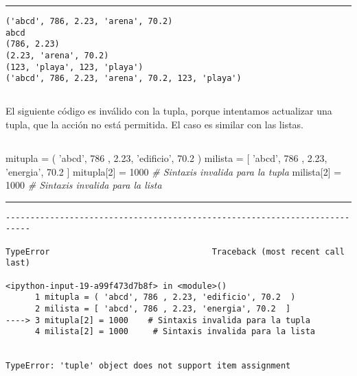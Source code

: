 \documentclass[]{article}
\newenvironment{Shaded}{}{}
\newcommand{\DecValTok}[1]{\textcolor[rgb]{0.25,0.63,0.44}{#1}}
\newcommand{\FloatTok}[1]{\textcolor[rgb]{0.25,0.63,0.44}{#1}}
\newcommand{\StringTok}[1]{\textcolor[rgb]{0.25,0.44,0.63}{#1}}
\newcommand{\CommentTok}[1]{\textcolor[rgb]{0.38,0.63,0.69}{\textit{#1}}}
\newcommand{\OperatorTok}[1]{\textcolor[rgb]{0.40,0.40,0.40}{#1}}
\newcommand{\NormalTok}[1]{#1}
\begin{document}
\begin{center}\rule{0.5\linewidth}{\linethickness}\end{center}

\begin{verbatim}
('abcd', 786, 2.23, 'arena', 70.2)
abcd
(786, 2.23)
(2.23, 'arena', 70.2)
(123, 'playa', 123, 'playa')
('abcd', 786, 2.23, 'arena', 70.2, 123, 'playa')
\end{verbatim}

\subsection{}\label{section-34}

El siguiente código es inválido con la tupla, porque intentamos
actualizar una tupla, que la acción no está permitida. El caso es
similar con las listas.

\subsection{}\label{section-35}

\begin{Shaded}
\begin{Highlighting}[]
\NormalTok{mitupla }\OperatorTok{=}\NormalTok{ ( }\StringTok{'abcd'}\NormalTok{, }\DecValTok{786}\NormalTok{ , }\FloatTok{2.23}\NormalTok{, }\StringTok{'edificio'}\NormalTok{, }\FloatTok{70.2}\NormalTok{  )}
\NormalTok{milista }\OperatorTok{=}\NormalTok{ [ }\StringTok{'abcd'}\NormalTok{, }\DecValTok{786}\NormalTok{ , }\FloatTok{2.23}\NormalTok{, }\StringTok{'energia'}\NormalTok{, }\FloatTok{70.2}\NormalTok{  ]}
\NormalTok{mitupla[}\DecValTok{2}\NormalTok{] }\OperatorTok{=} \DecValTok{1000}    \CommentTok{# Sintaxis invalida para la tupla}
\NormalTok{milista[}\DecValTok{2}\NormalTok{] }\OperatorTok{=} \DecValTok{1000}     \CommentTok{# Sintaxis invalida para la lista}
\end{Highlighting}
\end{Shaded}

\begin{center}\rule{0.5\linewidth}{\linethickness}\end{center}

\begin{verbatim}
---------------------------------------------------------------------------

TypeError                                 Traceback (most recent call last)

<ipython-input-19-a99f473d7b8f> in <module>()
      1 mitupla = ( 'abcd', 786 , 2.23, 'edificio', 70.2  )
      2 milista = [ 'abcd', 786 , 2.23, 'energia', 70.2  ]
----> 3 mitupla[2] = 1000    # Sintaxis invalida para la tupla
      4 milista[2] = 1000     # Sintaxis invalida para la lista


TypeError: 'tuple' object does not support item assignment
\end{verbatim}
\end{document}
